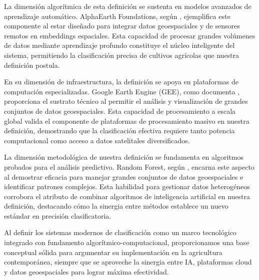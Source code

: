 La dimensión algorítmica de esta definición se sustenta en modelos avanzados de aprendizaje automático. AlphaEarth Foundations, según \cite{Brown2025}, ejemplifica este componente al estar diseñado para integrar datos geoespaciales y de sensores remotos en embeddings espaciales. Esta capacidad de procesar grandes volúmenes de datos mediante aprendizaje profundo constituye el núcleo inteligente del sistema, permitiendo la clasificación precisa de cultivos agrícolas que nuestra definición postula.

En su dimensión de infraestructura, la definición se apoya en plataformas de computación especializadas. Google Earth Engine (GEE), como documenta \cite{Gorelick2017}, proporciona el sustrato técnico al permitir el análisis y visualización de grandes conjuntos de datos geoespaciales. Esta capacidad de procesamiento a escala global valida el componente de plataformas de procesamiento masivo en nuestra definición, demostrando que la clasificación efectiva requiere tanto potencia computacional como acceso a datos satelitales diversificados.

La dimensión metodológica de nuestra definición se fundamenta en algoritmos probados para el análisis predictivo. Random Forest, según \cite{Breiman2001}, encarna este aspecto al demostrar eficacia para manejar grandes conjuntos de datos geoespaciales e identificar patrones complejos. Esta habilidad para gestionar datos heterogéneos corrobora el atributo de combinar algoritmos de inteligencia artificial en nuestra definición, destacando cómo la sinergia entre métodos establece un nuevo estándar en precisión clasificatoria.

Al definir los sistemas modernos de clasificación como un marco tecnológico integrado con fundamento algorítmico-computacional, proporcionamos una base conceptual sólida para argumentar su implementación en la agricultura contemporánea, siempre que se aproveche la sinergia entre IA, plataformas cloud y datos geoespaciales para lograr máxima efectividad.

